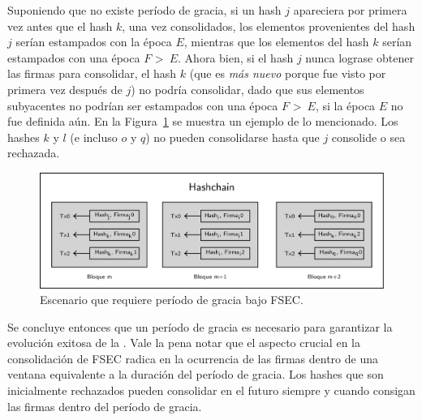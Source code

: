 Suponiendo que no existe período de gracia, si un hash $j$ apareciera por primera vez
antes que el hash $k$, una vez consolidados, los elementos provenientes del hash $j$
serían estampados con la época $E$, mientras que los elementos del hash $k$ serían estampados
con una época $F$ \textgreater \ $E$.
%
Ahora bien, 
%
si el hash $j$ nunca lograse obtener las \SPH firmas para
consolidar, el hash $k$ (que es \textit{más nuevo} porque fue visto por primera vez
después de $j$) no podría consolidar, dado que sus elementos subyacentes no podrían ser
estampados con una época $F$ \textgreater \ $E$, si la época $E$ no fue definida aún.
%
En la Figura~\ref{fig:grace_period} se muestra un ejemplo de lo mencionado. Los hashes
$k$ y $l$ (e incluso $o$ y $q$) no pueden consolidarse hasta que $j$ consolide o sea rechazada.

\begin{figure}
  \centering
  \includegraphics[scale=0.28]{figures/grace-period-example.png}
  \caption{Escenario que requiere período de gracia bajo FSEC.}
  \label{fig:grace_period}
\end{figure}

%
Se concluye entonces que un período de gracia es necesario para garantizar la evolución
exitosa de la \hashchain. 
%
Vale la pena notar que el aspecto crucial en la consolidación de FSEC radica en la ocurrencia
de las \SPH firmas dentro de una ventana equivalente a la duración
del período de gracia.
%
Los hashes que son inicialmente rechazados pueden consolidar en el futuro siempre y cuando
consigan las \SPH firmas dentro del período de gracia.
%


